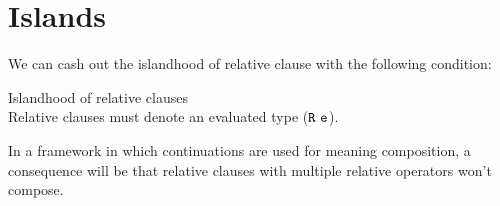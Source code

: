 \documentclass[nols,twoside,nofonts,nobib,nohyper]{tufte-handout}
\begin{document}
\section{Islands}

We can cash out the islandhood of relative clause with the following condition:

\ex
Islandhood of relative clauses\\
Relative clauses must denote an evaluated type ($\type{R e}$).
\xe

In a framework in which continuations are used for meaning composition, a
consequence will be that relative clauses with multiple relative operators won't compose.

\printbibliography
\end{document}
